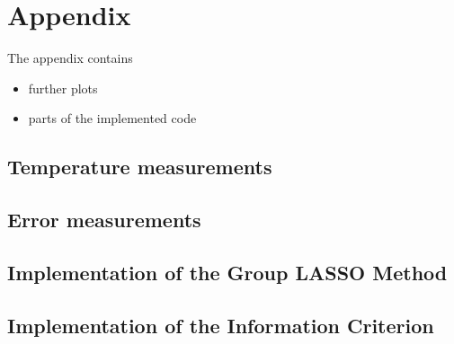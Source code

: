 \chapter{Appendix}
\label{apx:appendix}

The appendix contains 

\begin{itemize}
\item further plots
\item parts of the implemented code
\end{itemize}

\section{Temperature measurements}
\label{apx:Temp_meas}




\newpage


\section{Error measurements}
\label{apx:Error_meas}

\section{Implementation of the Group LASSO Method}
\label{apx:implementation_group_lasso}

\section{Implementation of the Information Criterion}
\label{apx:implementation_inform_criterion}



{\scriptsize

}
